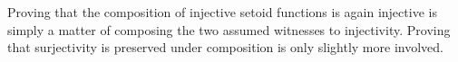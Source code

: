 \begin{code}
\AgdaSymbol{)}\<%
\\
%
\\[\AgdaEmptyExtraSkip]%
%
\>[1]\AgdaSpace{}%
\AgdaSymbol{:}\AgdaSpace{}%
\AgdaSymbol{(}\AgdaSpace{}%
\AgdaSpace{}%
\AgdaSymbol{)}\AgdaSpace{}%
%
\>[27]\AgdaSpace{}%
\AgdaSymbol{(}\AgdaSpace{}%
\AgdaSpace{}%
\AgdaSpace{}%
\AgdaSpace{}%
\AgdaSymbol{)}\<%
\\
%
\>[1]\AgdaSpace{}%
\AgdaSpace{}%
\AgdaSymbol{=}\AgdaSpace{}%
\AgdaSpace{}%
\AgdaSymbol{\{}\AgdaSymbol{\}}\AgdaSpace{}%
\AgdaSpace{}%
\AgdaSpace{}%
\AgdaSpace{}%
\AgdaSpace{}%
\<%
\\
%
\\[\AgdaEmptyExtraSkip]%
%
\>[1]\AgdaSpace{}%
\AgdaSymbol{:}\AgdaSpace{}%
\AgdaSymbol{(}\AgdaSpace{}%
\AgdaSymbol{:}\AgdaSpace{}%
\AgdaSpace{}%
\AgdaSpace{}%
\AgdaSymbol{)}\AgdaSpace{}%
\AgdaSpace{}%
\AgdaSpace{}%
\AgdaSpace{}%
\AgdaSpace{}%
\AgdaSpace{}%
\AgdaSpace{}%
\AgdaSpace{}%
\AgdaSpace{}%
\<%
\\
%
\>[1]\AgdaSpace{}%
\AgdaSpace{}%
\AgdaSpace{}%
\AgdaSpace{}%
\AgdaSymbol{=}\AgdaSpace{}%
\AgdaSpace{}%
\AgdaSpace{}%
\AgdaSymbol{(}\AgdaSpace{}%
\AgdaSymbol{\{}\AgdaSymbol{\})}\<%
\\
\>[0]\<%
\end{code}

Proving that the composition of injective setoid functions is again injective
is simply a matter of composing the two assumed witnesses to injectivity.
Proving that surjectivity is preserved under composition is only slightly more involved.

